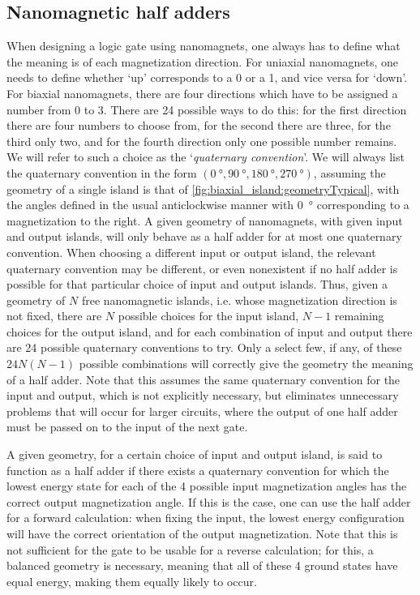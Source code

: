 \documentclass[11pt,a4paper,english]{article}
\begin{document}
\subsection{Nanomagnetic half adders}
When designing a logic gate using nanomagnets, one always has to define what the meaning is of each magnetization direction. For uniaxial nanomagnets, one needs to define whether `up' corresponds to a 0 or a 1, and vice versa for `down'. For biaxial nanomagnets, there are four directions which have to be assigned a number from 0 to 3. There are 24 possible ways to do this: for the first direction there are four numbers to choose from, for the second there are three, for the third only two, and for the fourth direction only one possible number remains. We will refer to such a choice as the `\textit{quaternary convention}'. We will always list the quaternary convention in the form $(\SI{0}{\degree}, \SI{90}{\degree}, \SI{180}{\degree}, \SI{270}{\degree})$, assuming the geometry of a single island is that of \cref{fig:biaxial_island:geometryTypical}, with the angles defined in the usual anticlockwise manner with \SI{0}{\degree} corresponding to a magnetization to the right. A given geometry of nanomagnets, with given input and output islands, will only behave as a half adder for at most one quaternary convention. When choosing a different input or output island, the relevant quaternary convention may be different, or even nonexistent if no half adder is possible for that particular choice of input and output islands. Thus, given a geometry of $N$ free nanomagnetic islands, i.e. whose magnetization direction is not fixed, there are $N$ possible choices for the input island, $N-1$ remaining choices for the output island, and for each combination of input and output there are 24 possible quaternary conventions to try. Only a select few, if any, of these $24N(N-1)$ possible combinations will correctly give the geometry the meaning of a half adder. Note that this assumes the same quaternary convention for the input and output, which is not explicitly necessary, but eliminates unnecessary problems that will occur for larger circuits, where the output of one half adder must be passed on to the input of the next gate. \par
A given geometry, for a certain choice of input and output island, is said to function as a half adder if there exists a quaternary convention for which the lowest energy state for each of the 4 possible input magnetization angles has the correct output magnetization angle. If this is the case, one can use the half adder for a forward calculation: when fixing the input, the lowest energy configuration will have the correct orientation of the output magnetization. Note that this is not sufficient for the gate to be usable for a reverse calculation; for this, a balanced geometry is necessary, meaning that all of these 4 ground states have equal energy, making them equally likely to occur. \par
\end{document}
